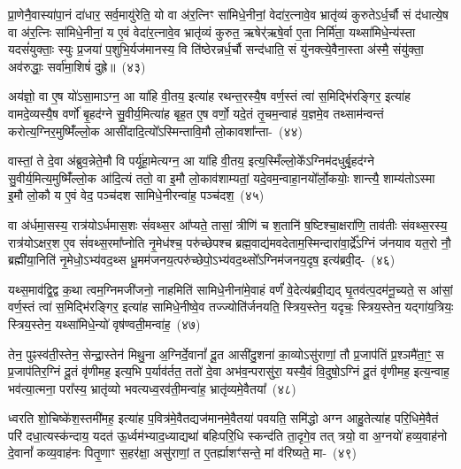 प्रा॒णेनै॒वास्या॑पा॒नं दा॑धार॒ सर्व॒मायु॑रेति॒ यो वा अ॑र॒त्निꣳ सा॑मिधे॒नीनां॒ वेदा॑र॒त्नावे॒व भ्रातृ॑व्यं कुरुते\-ऽर्ध॒र्चौ सं द॑धात्ये॒ष वा अ॑र॒त्निः सा॑मिधे॒नीनां॒ य ए॒वं वेदा॑र॒त्नावे॒व भ्रातृ॑व्यं कुरुत॒ ऋषेर्॑\mbox{}ऋषे॒र्वा ए॒ता निर्मि॑ता॒ यथ्सा॑मिधे॒न्य॑स्ता यदसं॑युक्ताः॒ स्युः प्र॒जया॑ प॒शुभि॒र्यज॑मानस्य॒ वि ति॑ष्ठेरन्नर्ध॒र्चौ सन्द॑धाति॒ सं यु॑नक्त्ये॒वैना॒स्ता अ॑स्मै॒ संयु॑क्ता॒ अव॑रुद्धाः॒ सर्वा॑मा॒शिषं॑ दुह्रे॥~(४३)


{\anuvakamend[{ब॒र्॒\mbox{}सं वो॑ जायन्ते॒ प्र वो॒ वाजा॑ लभेत दधाति॒ सन्दश॑ च}]}%

अय॑ज्ञो॒ वा ए॒ष यो॑\-ऽसा॒मा\-ऽग्न॒ आ या॑हि वी॒तय॒ इत्या॑ह रथन्त॒रस्यै॒ष वर्ण॒स्तं त्वा॑ स॒मिद्भि॑रङ्गिर॒ इत्या॑ह वामदे॒व्यस्यै॒ष वर्णो॑ बृ॒हद॑ग्ने सु॒वीर्य॒मित्या॑ह बृह॒त ए॒ष वर्णो॒ यदे॒तं तृ॒चम॒न्वाह॑ य॒ज्ञमे॒व तथ्साम॑न्वन्तं करोत्य॒ग्निर॒मुष्मिँ॑ल्लो॒क आसी॑दादि॒त्यो᳚\-ऽस्मिन्तावि॒मौ लो॒कावशा᳚न्ता-~(४४)

वास्तां॒ ते दे॒वा अ॑ब्रुव॒न्नेते॒मौ वि पर्यू॑हा॒मेत्यग्न॒ आ या॑हि वी॒तय॒ इत्य॒स्मिँल्लो॒के᳚\-ऽग्निम॑दधुर्बृ॒हद॑ग्ने सु॒वीर्य॒मित्य॒मुष्मिँ॑ल्लो॒क आ॑दि॒त्यं ततो॒ वा इ॒मौ लो॒काव॑शाम्यतां॒ यदे॒वम॒न्वाहा॒नयो᳚र्लो॒कयोः॒ शान्त्यै॒ शाम्य॑तो\-ऽस्मा इ॒मौ लो॒कौ य ए॒वं वेद॒ पञ्च॑दश सामिधे॒नीरन्वा॑ह॒ पञ्च॑दश॒~(४५)

वा अ॑र्धमा॒सस्य॒ रात्र॑यो\-ऽर्धमास॒शः सं॑वथ्स॒र आ᳚प्यते॒ तासां॒ त्रीणि॑ च श॒तानि॑ ष॒ष्टिश्चा॒क्षरा॑णि॒ ताव॑तीः संवथ्स॒रस्य॒ रात्र॑यो\-ऽक्षर॒श ए॒व सं॑वथ्स॒रमा᳚प्नोति नृ॒मेध॑श्च॒ परु॑च्छेपश्च ब्रह्म॒वाद्य॑मवदेताम॒स्मिन्दारा॑वा॒र्द्रे᳚\-ऽग्निं ज॑नयाव यत॒रो नौ॒ ब्रह्मी॑या॒निति॑ नृ॒मेधो॒\-ऽभ्य॑वद॒थ्स धू॒मम॑जनय॒त्परु॑च्छेपो॒\-ऽभ्य॑वद॒थ्सो᳚\-ऽग्निम॑जनय॒दृष॒ इत्य॑ब्रवी॒द्-~(४६)

यथ्स॒माव॑द्वि॒द्व क॒था त्वम॒ग्निमजी॑जनो॒ नाहमिति॑ सामिधे॒नीना॑मे॒वाहं वर्णं॑ वे॒देत्य॑ब्रवी॒द्यद् घृ॒तव॑त्प॒दम॑नू॒च्यते॒ स आ॑सां॒ वर्ण॒स्तं त्वा॑ स॒मिद्भि॑रङ्गिर॒ इत्या॑ह सामिधे॒नीष्वे॒व तज्ज्योति॑र्जनयति॒ स्त्रिय॒स्तेन॒ यदृचः॒ स्त्रिय॒स्तेन॒ यद्गा॑य॒त्रियः॒ स्त्रिय॒स्तेन॒ यथ्सा॑मिधे॒न्यो॑ वृष॑ण्वती॒मन्वा॑ह॒~(४७)

तेन॒ पुꣴस्व॑ती॒स्तेन॒ सेन्द्रा॒स्तेन॑ मिथु॒ना अ॒ग्निर्दे॒वानां᳚ दू॒त आसी॑दु॒शना॑ का॒व्यो\-ऽसु॑राणां॒ तौ प्र॒जा\-प॑तिं प्र॒श्ञमै॑ता॒ꣳ॒ स प्र॒जा\-प॑तिर॒ग्निं दू॒तं वृ॑णीमह॒ इत्य॒भि प॒र्याव॑र्तत॒ ततो॑ दे॒वा अभ॑व॒न्परासु॑रा॒ यस्यै॒वं वि॒दुषो॒\-ऽग्निं दू॒तं वृ॑णीमह॒ इत्य॒न्वाह॒ भव॑त्या॒त्मना॒ परा᳚स्य॒ भ्रातृ॑व्यो भवत्यध्व॒रव॑ती॒मन्वा॑ह॒ भ्रातृ॑व्यमे॒वैतया᳚~(४८)

ध्वरति शो॒चिष्के॑श॒स्तमी॑मह॒ इत्या॑ह प॒वित्र॑मे॒वैतद्यज॑\-मान\-मे॒वै\-तया॑ पवयति॒ समि॑द्धो अग्न आहु॒तेत्या॑ह परि॒धिमे॒वैतं परि॑ दधा॒\-त्य\-स्क॑न्दाय॒ यदत॑ ऊ॒र्ध्वम॑भ्याद॒ध्याद्यथा॑ बहिःपरि॒धि स्कन्द॑ति ता॒दृगे॒व तत् त्रयो॒ वा अ॒ग्नयो॑ हव्य॒वाह॑नो दे॒वानां᳚ कव्य॒वाह॑नः पितृ॒णाꣳ स॒हर॑क्षा॒ असु॑राणां॒ त ए॒तर्\mbox{}ह्याशꣳ॑सन्ते॒ मां व॑रिष्यते॒ मा-~(४९)

